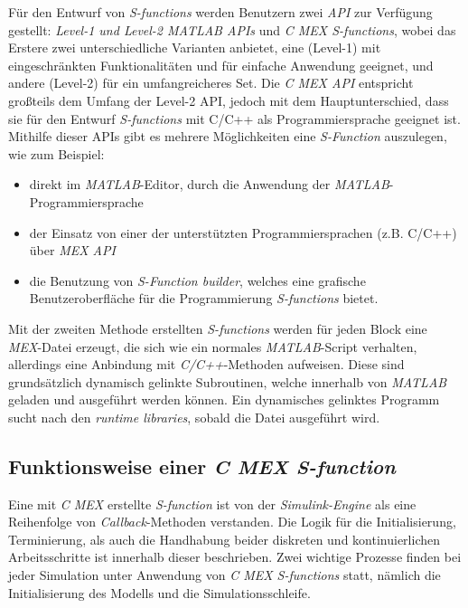 Für den Entwurf von \textit{S-functions} werden Benutzern zwei \textit{API} zur Verfügung gestellt: \textit{Level-1 und Level-2 MATLAB APIs} und \textit{C MEX S-functions}, wobei das Erstere zwei unterschiedliche Varianten anbietet, eine (Level-1) mit eingeschränkten Funktionalitäten und für einfache Anwendung geeignet, und andere (Level-2) für ein umfangreicheres Set. Die \textit{C MEX API} entspricht großteils dem Umfang der Level-2 API, jedoch mit dem Hauptunterschied, dass sie für den Entwurf \textit{S-functions} mit C/C++ als Programmiersprache geeignet ist. Mithilfe dieser APIs gibt es mehrere Möglichkeiten eine \textit{S-Function} auszulegen, wie zum Beispiel:
\begin{itemize}
    \item direkt im \textit{MATLAB}-Editor, durch die Anwendung der \textit{MATLAB}-Programmiersprache
    \item der Einsatz von einer der unterstützten Programmiersprachen (z.B. C/C++) über \textit{MEX API}
    \item die Benutzung von \textit{S-Function builder}, welches eine grafische Benutzeroberfläche für die Programmierung \textit{S-functions} bietet.
\end{itemize}

Mit der zweiten Methode erstellten \textit{S-functions} werden für jeden Block eine \textit{MEX}-Datei erzeugt, die sich wie ein normales \textit{MATLAB}-Script verhalten, allerdings eine Anbindung mit \textit{C/C++}-Methoden aufweisen. Diese sind grundsätzlich dynamisch gelinkte Subroutinen, welche innerhalb von \textit{MATLAB} geladen und ausgeführt werden können. Ein dynamisches gelinktes Programm sucht nach den \textit{runtime libraries}, sobald die Datei ausgeführt wird.

\subsection{Funktionsweise einer \textit{C MEX S-function}}


Eine mit \textit{C MEX} erstellte \textit{S-function} ist von der \textit{Simulink-Engine} als eine Reihenfolge von \textit{Callback}-Methoden verstanden. Die Logik für die Initialisierung, Terminierung, als auch die Handhabung beider diskreten und kontinuierlichen Arbeitsschritte ist innerhalb dieser beschrieben. Zwei wichtige Prozesse finden bei jeder Simulation unter Anwendung von \textit{C MEX S-functions} statt, nämlich die Initialisierung des Modells und die Simulationsschleife. \cite{SimulinkEngineInteractiona}

